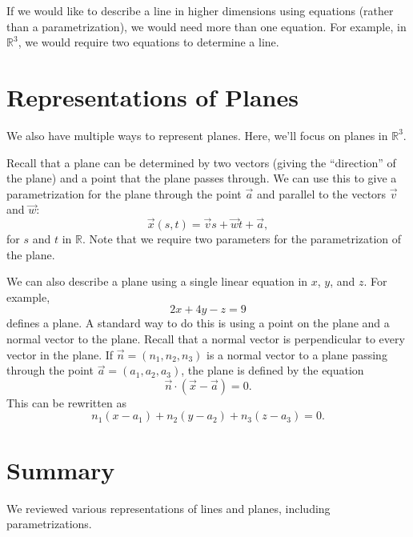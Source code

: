 \documentclass{ximera}
\begin{document}
 If we would like to describe a line in higher dimensions using equations (rather than a parametrization), we would need more than one equation. For example, in $\mathbb{R}^3$, we would require two equations to determine a line.
 
 \section{Representations of Planes}
 
 We also have multiple ways to represent planes. Here, we'll focus on planes in $\mathbb{R}^3$.
 
 Recall that a plane can be determined by two vectors (giving the ``direction'' of the plane) and a point that the plane passes through. We can use this to give a parametrization for the plane through the point $\vec{a}$ and parallel to the vectors $\vec{v}$ and $\vec{w}$:
 \[
 \vec{x}(s,t) = \vec{v}s+\vec{w}t + \vec{a},
 \]
 for $s$ and $t$ in $\mathbb{R}$. Note that we require two parameters for the parametrization of the plane.

We can also describe a plane using a single linear equation in $x$, $y$, and $z$. For example,
\[
2x+4y-z=9
\]
defines a plane. A standard way to do this is using a point on the plane and a normal vector to the plane. Recall that a normal vector is perpendicular to every vector in the plane. If $\vec{n}=(n_1,n_2,n_3)$ is a normal vector to a plane passing through the point $\vec{a}=(a_1,a_2,a_3)$, the plane is defined by the equation
\[
\vec{n}\cdot(\vec{x}-\vec{a})=0.
\]
This can be rewritten as
\[
n_1(x-a_1)+n_2(y-a_2)+n_3(z-a_3)=0.
\]

\section{Summary}

We reviewed various representations of lines and planes, including parametrizations.
\end{document}
